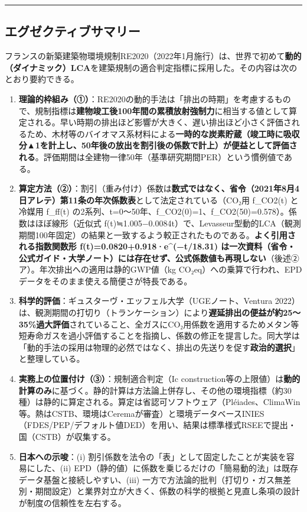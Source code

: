 \documentclass[11pt]{article}
\providecommand{\tightlist}{\setlength{\itemsep}{0pt}\setlength{\parskip}{0pt}}
\begin{document}
\begin{center}\rule{0.5\linewidth}{0.5pt}\end{center}

\hypertarget{ux30a8ux30b0ux30bcux30afux30c6ux30a3ux30d6ux30b5ux30deux30eaux30fc}{%
\subsection{エグゼクティブサマリー}\label{ux30a8ux30b0ux30bcux30afux30c6ux30a3ux30d6ux30b5ux30deux30eaux30fc}}

フランスの新築建築物環境規制RE2020（2022年1月施行）は、世界で初めて\textbf{動的（ダイナミック）LCA}を建築規制の適合判定指標に採用した。その内容は次のとおり要約できる。

\begin{enumerate}
\def\labelenumi{\arabic{enumi}.}
\tightlist
\item
  \textbf{理論的枠組み（①）}：RE2020の動的手法は「排出の時期」を考慮するもので、規制指標は\textbf{建物竣工後100年間の累積放射強制力}に相当する値として算定される。早い時期の排出ほど影響が大きく、遅い排出ほど小さく評価されるため、木材等のバイオマス系材料による\textbf{一時的な炭素貯蔵（竣工時に吸収分▲1を計上し、50年後の放出を割引後の係数で計上）が便益として評価される}。評価期間は全建物一律50年（基準研究期間PER）という慣例値である。
\item
  \textbf{算定方法（②）}：割引（重み付け）係数は\textbf{数式ではなく、省令（2021年8月4日アレテ）第11条の年次係数表}として法定されている（CO₂用
  f\_CO2(t) と冷媒用 f\_ff(t)
  の2系列、t=0〜50年、f\_CO2(0)=1、f\_CO2(50)=0.578）。係数はほぼ線形（近似式
  f(t)≒1.005−0.0084t）で、Levasseur型動的LCA（観測期間100年固定）の結果と一致するよう較正されたものである。\textbf{よく引用される指数関数形
  f(t)=0.0820+0.918·e\^{}(−t/18.31)
  は一次資料（省令・公式ガイド・大学ノート）には存在せず、公式係数値も再現しない}（後述②ア）。年次排出への適用は静的GWP値（kg
  CO₂eq）への乗算で行われ、EPDデータをそのまま使える簡便さが特長である。
\item
  \textbf{科学的評価}：ギュスターヴ・エッフェル大学（UGEノート、Ventura
  2022）は、観測期間の打切り（トランケーション）により\textbf{遅延排出の便益が約25〜35\%過大評価}されていること、全ガスにCO₂用係数を適用するためメタン等短寿命ガスを過小評価することを指摘し、係数の修正を提言した。同大学は「動的手法の採用は物理的必然ではなく、排出の先送りを促す\textbf{政治的選択}」と整理している。
\item
  \textbf{実務上の位置付け（③）}：規制適合判定（Ic
  construction等の上限値）は\textbf{動的計算のみ}に基づく。静的計算は方法論上併存し、その他の環境指標（約30種）は静的に算定される。算定は省認可ソフトウェア（Pléiades、ClimaWin等。熱はCSTB、環境はCeremaが審査）と環境データベースINIES（FDES/PEP/デフォルト値DED）を用い、結果は標準様式RSEEで提出・国（CSTB）が収集する。
\item
  \textbf{日本への示唆}：(i)
  割引係数を法令の「表」として固定したことが実装を容易にした、(ii)
  EPD（静的値）に係数を乗じるだけの「簡易動的法」は既存データ基盤と接続しやすい、(iii)
  一方で方法論的批判（打切り・ガス無差別・期間設定）と業界対立が大きく、係数の科学的根拠と見直し条項の設計が制度の信頼性を左右する。
\end{enumerate}
\end{document}
